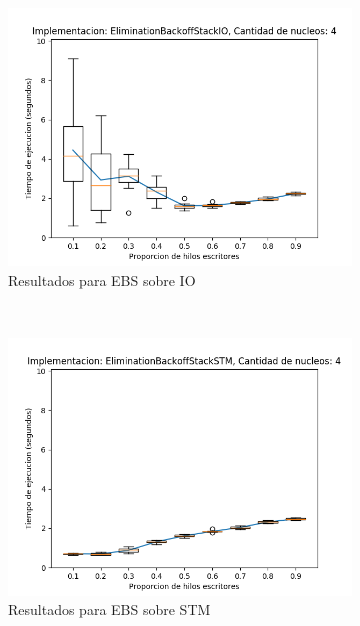 \begin{appendices}
\begin{figure}[H]
    \centering
    \begin{subfigure}[b]{0.49\textwidth}
        \includegraphics[width=\textwidth]{images/pushPercentages/plots/expEBSIO-4}
        \caption{Resultados para EBS sobre IO}
        \label{subfig:pushPercentages-ebsio-4}
    \end{subfigure}
    ~
    \begin{subfigure}[b]{0.49\textwidth}
        \includegraphics[width=\textwidth]{images/pushPercentages/plots/expEBSSTM-4}
        \caption{Resultados para EBS sobre STM}
        \label{subfig:pushPercentages-ebsstm-4}
    \end{subfigure}
    \begin{subfigure}[b]{0.49\textwidth}

\end{subfigure}
\end{figure}
\end{appendices}
